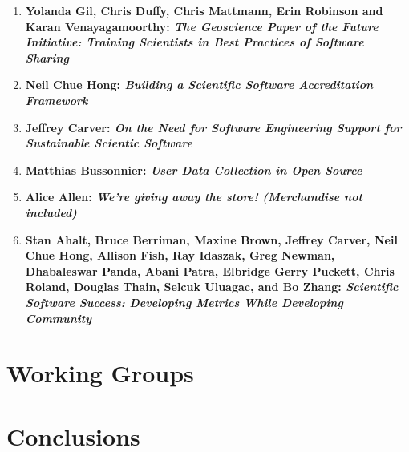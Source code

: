 \documentclass[11pt, oneside]{amsart}
\begin{document}
\begin{enumerate}
\item \textbf{Yolanda Gil, Chris Duffy, Chris Mattmann, Erin Robinson and Karan
Venayagamoorthy: \textit{The Geoscience Paper of the Future Initiative: Training
Scientists in Best Practices of Software Sharing}}

\item \textbf{Neil Chue Hong: \textit{Building a Scientific Software Accreditation
Framework}}

\item \textbf{Jeffrey Carver: \textit{On the Need for Software Engineering Support for
Sustainable Scientic Software}}

\item \textbf{Matthias Bussonnier: \textit{User Data Collection in Open Source}}

\item \textbf{Alice Allen: \textit{We’re giving away the store! (Merchandise not
included)}}

\item \textbf{Stan Ahalt, Bruce Berriman, Maxine Brown, Jeffrey Carver, Neil
Chue Hong, Allison Fish, Ray Idaszak, Greg Newman, Dhabaleswar Panda, Abani
Patra, Elbridge Gerry Puckett, Chris Roland, Douglas Thain, Selcuk Uluagac, and
Bo Zhang: \textit{Scientific Software Success: Developing Metrics While Developing
Community}}

\end{enumerate}

\section{Working Groups} \label{sec:WGs}













\section{Conclusions} \label{sec:conclusions}
\end{document}
